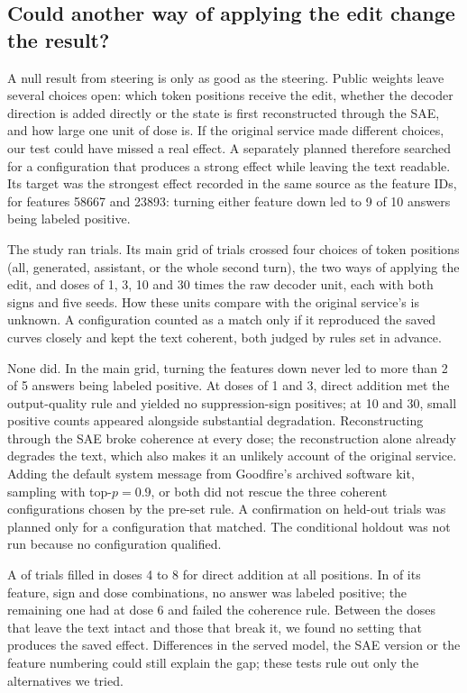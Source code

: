 \subsection{Could another way of applying the edit change the result?}
\label{sec:operator-matching}

A null result from steering is only as good as the steering. Public weights
leave several choices open: which token positions receive the edit, whether
the decoder direction is added directly or the state is first reconstructed
through the SAE, and how large one unit of dose is. If the original service
made different choices, our test could have missed a real effect. A
separately planned
 therefore searched for a configuration that produces a strong effect
while leaving the text readable. Its target was the strongest effect recorded
in the same source as the feature IDs, for features 58667 and 23893: turning
either feature down led to 9 of 10 answers being labeled positive.

The study ran \CEOperatorTrials{} trials. Its main grid of \CEOperatorGrid{}
trials crossed four choices of token positions (all, generated, assistant, or
the whole second turn), the two ways of applying the edit, and doses of 1, 3,
10 and 30 times the raw decoder unit, each with both signs and five seeds. How
these units compare with the original service's is unknown. A configuration
counted as a match only if it reproduced the saved curves closely and kept
the text coherent, both judged by rules set in advance.

None did. In the main grid, turning the features down never led to more than
2 of 5 answers being labeled positive. At doses of 1 and 3, direct addition
met the output-quality rule and yielded no suppression-sign positives; at
10 and 30, small positive counts appeared alongside substantial degradation.
Reconstructing through the SAE broke
coherence at every dose; the reconstruction alone already degrades the text,
which also makes it an unlikely account of the original service. Adding the default system message from Goodfire's
archived software kit, sampling with top-$p=0.9$, or both did not rescue the
three coherent configurations chosen by the pre-set rule. A confirmation on
held-out trials was planned only for a configuration that matched. The
conditional holdout was not run because no configuration qualified.

A 
of \CEFineTrials{} trials filled in doses 4 to 8 for direct addition at all
positions. In \CEFineZeroCells{} of its \CEFineCells{} feature, sign and dose
combinations, no answer was labeled positive; the remaining one had
\CEFineRemainingPositive{} at dose 6 and failed the coherence rule. Between
the doses that leave the text intact and those that break it, we found no
setting that produces the saved effect. Differences in the served model, the
SAE version or the feature numbering could still explain the gap; these
tests rule out only the alternatives we tried.

